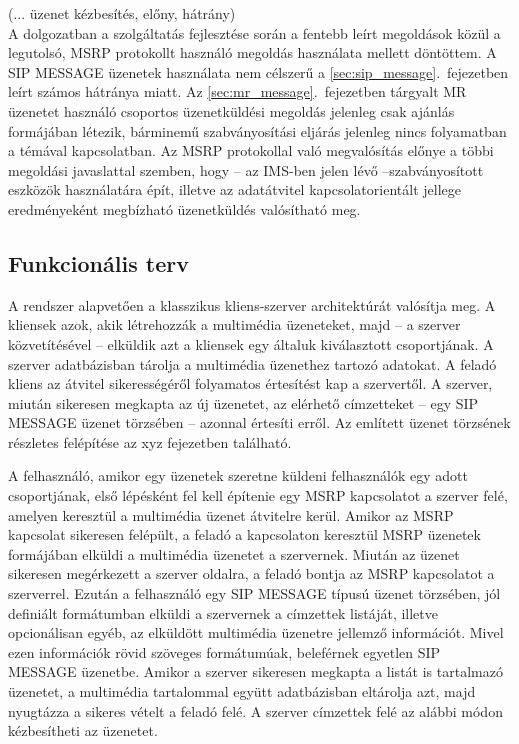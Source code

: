 {\color{red} (... üzenet kézbesítés, előny, hátrány)}
\\
A dolgozatban a szolgáltatás fejlesztése során a fentebb leírt megoldások közül a legutolsó, MSRP protokollt használó megoldás használata mellett döntöttem. A SIP MESSAGE üzenetek használata nem célszerű a \ref{sec:sip_message}.~fejezetben leírt számos hátránya miatt. Az \ref{sec:mr_message}.~fejezetben tárgyalt MR üzenetet használó csoportos üzenetküldési megoldás jelenleg csak ajánlás formájában létezik, bárminemű szabványosítási eljárás jelenleg nincs folyamatban a témával kapcsolatban. Az MSRP protokollal való megvalósítás előnye a többi megoldási javaslattal szemben, hogy -- az IMS-ben jelen lévő --szabványosított eszközök használatára épít, illetve az adatátvitel kapcsolatorientált jellege eredményeként megbízható üzenetküldés valósítható meg. 

\subsection{Funkcionális terv}

A rendszer alapvetően a klasszikus kliens-szerver architektúrát valósítja meg. A kliensek azok, akik létrehozzák a multimédia üzeneteket, majd -- a szerver közvetítésével -- elküldik azt a kliensek egy általuk kiválasztott csoportjának. A szerver adatbázisban tárolja a multimédia üzenethez tartozó adatokat. A feladó kliens az átvitel sikerességéről folyamatos értesítést kap a szervertől. A szerver, miután sikeresen megkapta az új üzenetet, az elérhető címzetteket -- egy SIP MESSAGE üzenet törzsében -- azonnal értesíti erről. Az említett üzenet törzsének részletes felépítése az {\color{red}xyz fejezetben} található. 

A felhasználó, amikor egy üzenetek szeretne küldeni felhasználók egy adott csoportjának, első lépésként fel kell építenie egy MSRP kapcsolatot a szerver felé, amelyen keresztül a multimédia üzenet átvitelre kerül. Amikor az MSRP kapcsolat sikeresen felépült, a feladó a kapcsolaton keresztül MSRP üzenetek formájában elküldi a multimédia üzenetet a szervernek. Miután az üzenet sikeresen megérkezett a szerver oldalra, a feladó bontja az MSRP kapcsolatot a szerverrel. Ezután a felhasználó egy SIP MESSAGE típusú üzenet törzsében, jól definiált formátumban elküldi a szervernek a címzettek listáját, illetve opcionálisan egyéb, az elküldött multimédia üzenetre jellemző információt. Mivel ezen információk rövid szöveges formátumúak, beleférnek egyetlen SIP MESSAGE üzenetbe. Amikor a szerver sikeresen megkapta a listát is tartalmazó üzenetet, a multimédia tartalommal együtt adatbázisban eltárolja azt, majd nyugtázza a sikeres vételt a feladó felé. A szerver címzettek felé az alábbi módon kézbesítheti az üzenetet.

